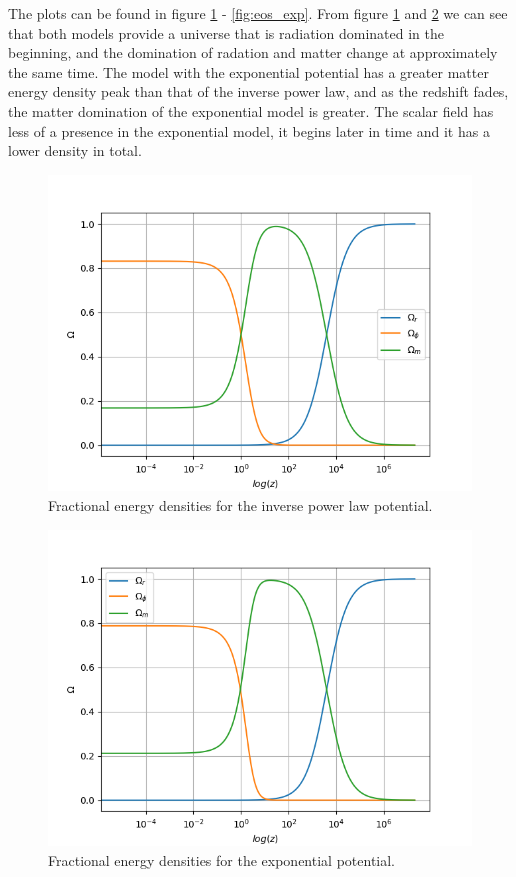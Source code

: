 \documentclass[a4paper,10pt]{article}
\begin{document}
The plots can be found in figure \ref{fig:omega_ipl} - \ref{fig:eos_exp}. From figure \ref{fig:omega_ipl} and \ref{fig:omega_exp} we can see that both models provide a universe that is radiation dominated in the beginning, and the domination of radation and matter change at approximately the same time. The model with the exponential potential has a greater matter energy density peak than that of the inverse power law, and as the redshift fades, the matter domination of the exponential model is greater. The scalar field has less of a presence in the exponential model, it begins later in time and it has a lower density in total.

\begin{figure}[H]
\centering
\includegraphics[width=12cm]{omega_IPL.png}
\caption{Fractional energy densities for the inverse power law potential.}
\label{fig:omega_ipl}
\end{figure}
\begin{figure}[H]
\centering
\includegraphics[width=12cm]{omega_EXP.png}
\caption{Fractional energy densities for the exponential potential.}
\label{fig:omega_exp}
\end{figure}
\end{document}
